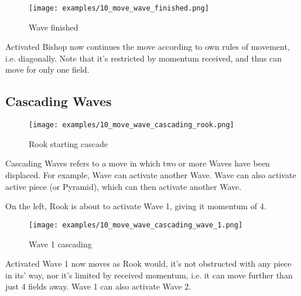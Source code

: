 \clearpage %

\noindent
\begin{figure}[h]
\texttt{[image: examples/10\_move\_wave\_finished.png]}
\caption{Wave finished}
\label{fig:10_move_wave_finished}
\end{figure}

Activated Bishop now continues the move according to own rules of movement,
i.e. diagonally. Note that it's restricted by momentum received, and thus
can move for only one field.

\clearpage %

\subsection*{Cascading Waves}

\noindent
\begin{wrapfigure}[13]{l}{0.5625\textwidth}
\texttt{[image: examples/10\_move\_wave\_cascading\_rook.png]}
\caption{Rook starting cascade}
\label{fig:10_move_wave_cascading_rook}
\end{wrapfigure}
Cascading Waves refers to a move in which two or more Waves have been displaced.
For example, Wave can activate another Wave. Wave can also activate active
piece (or Pyramid), which can then activate another Wave.

On the left, Rook is about to activate Wave 1, giving it momentum of 4.

\vspace*{0.05\textheight}
\noindent
\begin{wrapfigure}[9]{r}{0.5625\textwidth}
\texttt{[image: examples/10\_move\_wave\_cascading\_wave\_1.png]}
\caption{Wave 1 cascading}
\label{fig:10_move_wave_cascading_wave_1}
\end{wrapfigure}
Activated Wave 1 now moves as Rook would, it's not obstructed with any
piece in its' way, nor it's limited by received momentum, i.e. it can move
further than just 4 fields away. Wave 1 can also activate Wave 2.

\clearpage %

